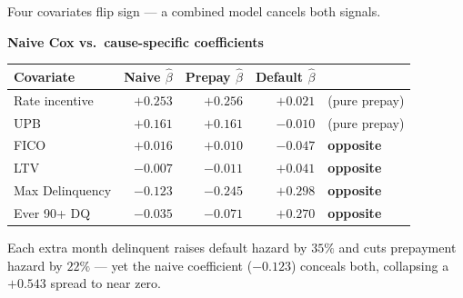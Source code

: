 \documentclass[10pt,aspectratio=169]{beamer}
\begin{document}
\begin{frame}{Four covariates flip sign --- a combined model cancels both signals.}
    \vspace{0.2em}
    \begin{center}
    \small
    \textbf{Naive Cox vs.\ cause-specific coefficients}\\[4pt]
    \begin{tabular}{lrrrp{2.6cm}}
        \toprule
        \textbf{Covariate} & \textbf{Naive $\hat\beta$} & \textbf{Prepay $\hat\beta$} & \textbf{Default $\hat\beta$} & \\
        \midrule
        Rate incentive   & $+0.253$ & \textcolor{good}{$+0.256$} & $+0.021$                   & (pure prepay) \\
        UPB              & $+0.161$ & \textcolor{good}{$+0.161$} & $-0.010$                   & (pure prepay) \\
        \midrule
        FICO             & $+0.016$ & \textcolor{good}{$+0.010$} & \textcolor{bad}{$-0.047$}  & \textbf{opposite} \\
        LTV              & $-0.007$ & \textcolor{bad}{$-0.011$}  & \textcolor{good}{$+0.041$} & \textbf{opposite} \\
        Max Delinquency  & $-0.123$ & \textcolor{bad}{$-0.245$}  & \textcolor{good}{$+0.298$} & \textbf{opposite} \\
        Ever 90+ DQ      & $-0.035$ & \textcolor{bad}{$-0.071$}  & \textcolor{good}{$+0.270$} & \textbf{opposite} \\
        \bottomrule
    \end{tabular}
    \end{center}
    \vspace{0.3em}
    \begin{center}
        \small
        Each extra month delinquent raises default hazard by $35\%$ and cuts prepayment hazard by $22\%$
        --- yet the naive coefficient ($-0.123$) conceals both, collapsing a $+0.543$ spread to near zero.
    \end{center}
\end{frame}
\end{document}
